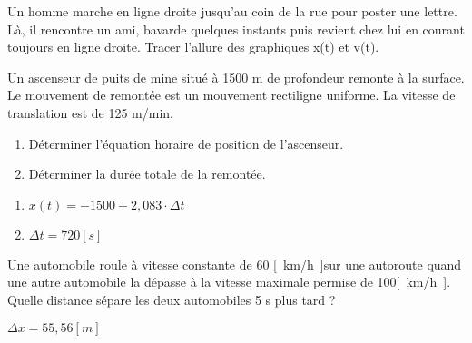 \begin{exercise}
    Un homme marche en ligne droite jusqu'au coin de la rue pour poster une lettre. Là, il rencontre un ami, bavarde quelques instants puis revient chez lui en courant toujours en ligne droite.
    Tracer l'allure des graphiques x(t) et v(t).
\end{exercise}
\begin{solution}
\end{solution}

\begin{exercise}
    Un ascenseur de puits de mine situé à 1500 m de profondeur remonte à la surface. Le mouvement de remontée est un mouvement rectiligne uniforme. La vitesse de translation est de 125 m/min.
    \begin{enumerate}[label=\alph*)]
        \item Déterminer l'équation horaire de position de l'ascenseur.
        \item Déterminer la durée totale de la remontée.
    \end{enumerate}
\end{exercise}
\begin{solution}
    \begin{enumerate}[label=\alph*)]
        \item \(x(t)=-1500 + 2,083 \cdot \Delta t\)
        \item \(\Delta t=720[s]\)
    \end{enumerate}
\end{solution}

\begin{exercise}
    Une automobile roule à vitesse constante de 60 \unit{[km/h]}sur une autoroute quand une autre automobile la dépasse à la vitesse maximale permise de 100\unit{[km/h]}. Quelle distance sépare les deux automobiles 5 s plus tard ?
\end{exercise}
\begin{solution}
    \(\Delta x=55,56\unit{[m]}\)
\end{solution}

